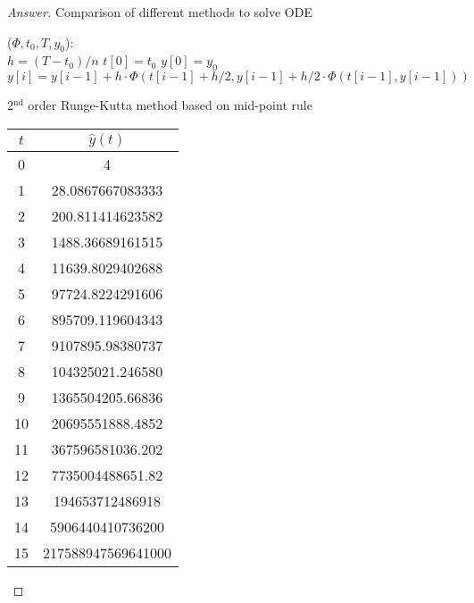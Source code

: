 \begin{proof}[Answer]
\begin{table}[H]
\begin{table}[htbp]
	\caption{Comparison of different methods to solve ODE}
	\label{odecomparisontab}
\end{table}
\ifnum{}
	\begin{algorithm2e}[H]
\else
	\begin{algorithm2e}[htbp]
\fi
	\KwFn(\(\Phi,t_0,T,y_0\)){:\\ }
	{
		\(h=(T-t_0)/n\)\;
		\(t[0]=t_0\)\;
		\(y[0]=y_0\)\;
		{
			\(y[i]=y[i-1]+h\cdot\Phi\left(t[i-1]+h/2,y[i-1]+h/2\cdot\Phi(t[i-1],y[i-1])\right)\)\;
		}
	}
	\caption{2\(^\text{nd}\) order Runge-Kutta method based on mid-point rule}
\end{algorithm2e}
\ifnum{}
	\begin{table}[H]
\else
	\begin{table}[htbp]
\fi
		\centering
		\begin{tabular}[t]{|c|c|}
		\hline
		\(t\)	&	\(\hat{y}(t)\)	\\	\hline
		0	&	4					\\	\hline
		1	&	28.0867667083333	\\	\hline
		2	&	200.811414623582	\\	\hline
		3	&	1488.36689161515	\\	\hline
		4	&	11639.8029402688	\\	\hline
		5	&	97724.8224291606	\\	\hline
		6	&	895709.119604343	\\	\hline
		7	&	9107895.98380737	\\	\hline
		8	&	104325021.246580	\\	\hline
		9	&	1365504205.66836	\\	\hline
		10	&	20695551888.4852	\\	\hline
		11	&	367596581036.202	\\	\hline
		12	&	7735004488651.82	\\	\hline
		13	&	194653712486918		\\	\hline
		14	&	5906440410736200	\\	\hline
		15	&	217588947569641000	\\	\hline
		\end{tabular}

\end{table}
\end{table}
\end{algorithm2e}
\end{table}
\end{proof}
